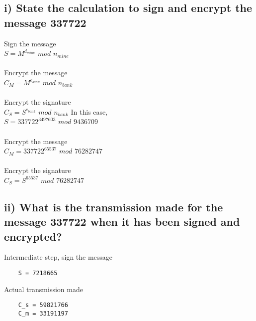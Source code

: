\documentclass[a4paper,12pt]{article}
\begin{document}
\subsection*{i) State the calculation to sign and encrypt the message 337722}
Sign the message\\
$S = M^{d_{mine}}$ $mod$ $n_{mine}$ \\ \\
Encrypt the message\\
$C_M = M^{e_{bank}}$ $mod$ $n_{bank}$\\\\
Encrypt the signature\\
$C_S = S^{e_{bank}}$ $mod$ $n_{bank}$\newpage
%
\noindent In this case,\\
$S = 337722^{3497603}$ $mod$ $9436709$ \\ \\
Encrypt the message\\
$C_M = 337722^{65537}$ $mod$ $76282747$\\\\
Encrypt the signature\\
$C_S = S^{65537}$ $mod$ $76282747$

\subsection*{ii) What is the transmission made for the message 337722 when it has been signed and encrypted?}
Intermediate step, sign the message
\begin{verbatim}
    S = 7218665
\end{verbatim}
Actual transmission made
\begin{verbatim}
    C_s = 59821766
    C_m = 33191197
\end{verbatim}
\end{document}
